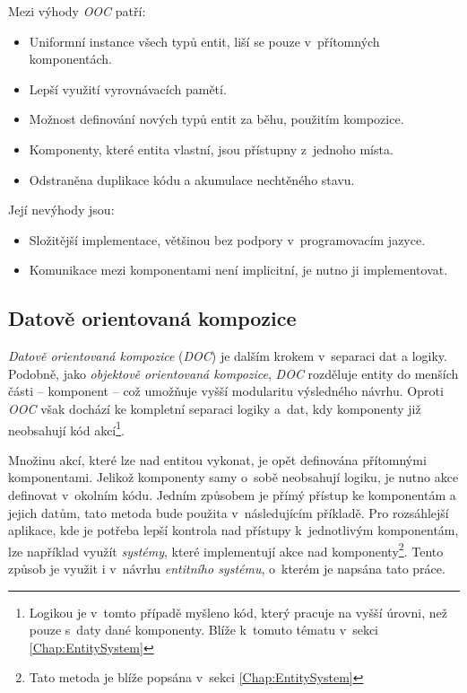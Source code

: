 \noindent Mezi výhody \emph{OOC} patří: 
\begin{itemize}
	\item Uniformní instance všech typů entit, liší se pouze v~přítomných komponentách.
	\item Lepší využití vyrovnávacích pamětí.
	\item Možnost definování nových typů entit za běhu, použitím kompozice.
	\item Komponenty, které entita vlastní, jsou přístupny z~jednoho místa.
	\item Odstraněna duplikace kódu a akumulace nechtěného stavu.
\end{itemize}

\noindent Její nevýhody jsou: 
\begin{itemize}
	\item Složitější implementace, většinou bez podpory v~programovacím jazyce.
	\item Komunikace mezi komponentami není implicitní, je nutno ji implementovat. 
\end{itemize}

\pagebreak

\subsection{Datově orientovaná kompozice}
\label{Chap:DOC}

\emph{Datově orientovaná kompozice} (\emph{DOC}) je dalším krokem v~separaci dat a logiky. Podobně, jako \emph{objektově orientovaná kompozice}, \emph{DOC} rozděluje entity do menších části -- komponent -- což umožňuje vyšší modularitu výsledného návrhu. Oproti \emph{OOC} však dochází ke kompletní separaci logiky a~dat, kdy komponenty již neobsahují kód akcí\footnote{Logikou je v~tomto případě myšleno kód, který pracuje na vyšší úrovni, než pouze s~daty dané komponenty. Blíže k~tomuto tématu v~sekci \ref{Chap:EntitySystem}}.

Množinu akcí, které lze nad entitou vykonat, je opět definována přítomnými komponentami. Jelikož komponenty samy o~sobě neobsahují logiku, je nutno akce definovat v~okolním kódu. Jedním způsobem je přímý přístup ke komponentám a jejich datům, tato metoda bude použita v~následujícím příkladě. Pro rozsáhlejší aplikace, kde je potřeba lepší kontrola nad přístupy k~jednotlivým komponentám, lze například využít \emph{systémy}, které implementují akce nad komponenty\footnote{Tato metoda je blíže popsána v~sekci \ref{Chap:EntitySystem}}. Tento způsob je využit i v~návrhu \emph{entitního systému}, o~kterém je napsána tato práce.

